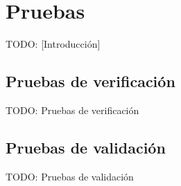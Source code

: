 \chapter{Pruebas\label{cap:pruebas}}

TODO: [Introducción]


\section{Pruebas de verificación\label{sec:pb:verificacion}}

TODO: Pruebas de verificación


\section{Pruebas de validación\label{sec:pb:validacion}}

TODO: Pruebas de validación